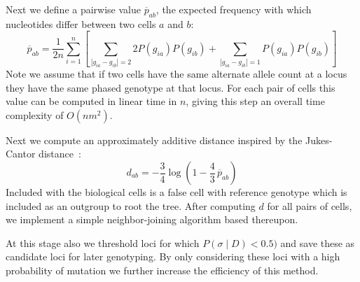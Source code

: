 \documentclass[../../main.tex]{subfiles}
\begin{document}
Next we define a pairwise value $\overline{p}_{ab}$, the expected frequency with which nucleotides differ between two cells $a$ and $b$:
\begin{equation*}
    \overline{p}_{ab} = \frac{1}{2n}\sum_{i=1}^n\left[ \sum_{|g_{ia}-g_{ib}|=2} 2P(g_{ia})P(g_{ib}) + \sum_{|g_{ia}-g_{ib}|=1} P(g_{ia})P(g_{ib})\right]
\end{equation*}
Note we assume that if two cells have the same alternate allele count at a locus they have the same phased genotype at that locus.
For each pair of cells this value can be computed in linear time in $n$, giving this step an overall time complexity of $O(nm^2)$.

Next we compute an approximately additive distance inspired by the Jukes-Cantor distance~\cite{BSA, JC}:
\begin{equation}
    d_{ab} = -\frac{3}{4}\log \left(1-\frac{4}{3}\,\overline{p}_{ab}\right)
\end{equation}
Included with the biological cells is a false cell with reference genotype which is included as an outgroup to root the tree.
After computing $d$ for all pairs of cells, we implement a simple neighbor-joining algorithm based thereupon.

At this stage also we threshold loci for which $P(\sigma \mid D) < 0.5)$ and save these as candidate loci for later genotyping.
By only considering these loci with a high probability of mutation we further increase the efficiency of this method.
\end{document}
